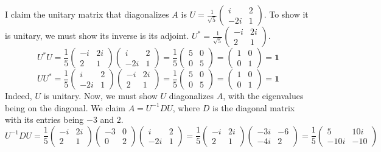 \documentclass[12pt]{article}
\begin{document}
I claim the unitary matrix that diagonalizes $A$ is $U = \frac{1}{\sqrt{5}} \begin{pmatrix} i & 2 \\ -2i & 1 \end{pmatrix}$. To show it is unitary, we must show its inverse is its adjoint. $U^* = \frac{1}{\sqrt{5}} \begin{pmatrix} -i & 2i \\ 2 & 1 \end{pmatrix}$.
$$U^*U = \frac{1}{5} \begin{pmatrix} -i & 2i \\ 2 & 1 \end{pmatrix} \begin{pmatrix} i & 2 \\ -2i & 1 \end{pmatrix} = \frac{1}{5} \begin{pmatrix} 5 & 0 \\ 0 & 5\end{pmatrix} = \begin{pmatrix} 1 & 0 \\ 0 & 1 \end{pmatrix} = \textbf{1}$$
$$UU^* = \frac{1}{5} \begin{pmatrix} i & 2 \\ -2i & 1 \end{pmatrix} \begin{pmatrix} -i & 2i \\ 2 & 1 \end{pmatrix} = \frac{1}{5} \begin{pmatrix} 5 & 0 \\ 0 & 5\end{pmatrix} = \begin{pmatrix} 1 & 0 \\ 0 & 1 \end{pmatrix} = \textbf{1}$$
Indeed, $U$ is unitary. Now, we must show $U$ diagonalizes $A$, with the eigenvalues being on the diagonal. We claim $A = U^{-1}DU$, where $D$ is the diagonal matrix with its entries being $-3$ and $2$.
$$U^{-1}DU = \frac{1}{5} \begin{pmatrix} -i & 2i \\ 2 & 1 \end{pmatrix} \begin{pmatrix} -3 & 0 \\ 0 & 2 \end{pmatrix} \begin{pmatrix} i & 2 \\ -2i & 1 \end{pmatrix} = \frac{1}{5} \begin{pmatrix} -i & 2i \\ 2 & 1 \end{pmatrix} \begin{pmatrix} -3i & -6 \\ -4i & 2 \end{pmatrix} = \frac{1}{5} \begin{pmatrix} 5 & 10i \\ -10i & -10\end{pmatrix}$$
\end{document}
